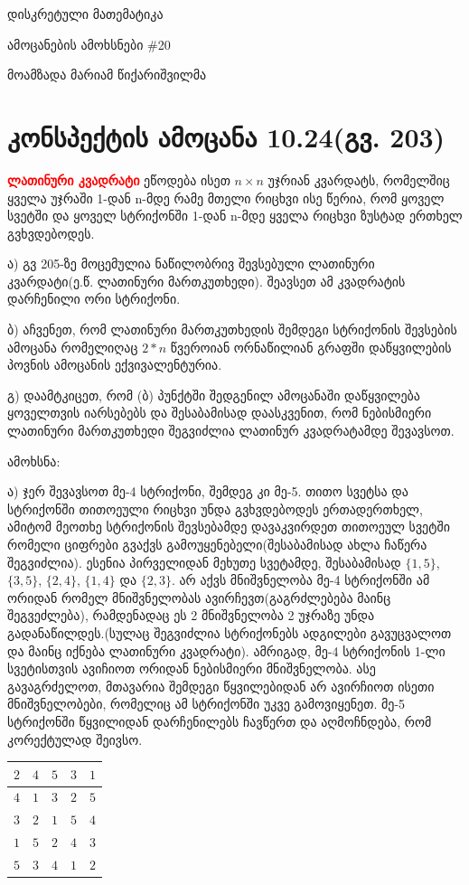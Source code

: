 \documentclass[a4paper, 11pt]{article}
\begin{document}
\begin{sloppypar}

\begin{center}
\Large
{
დისკრეტული მათემატიკა
}

\large
ამოცანების ამოხსნები \#20

\normalsize
\hfill მოამზადა მარიამ წიქარიშვილმა
\end{center}

\section{კონსპექტის ამოცანა 10.24(გვ. 203)}

\textbf{\textcolor{red}{ლათინური კვადრატი}} ეწოდება ისეთ $n\times n$ უჯრიან კვარდატს, რომელშიც ყველა უჯრაში 1-დან n-მდე რამე მთელი რიცხვი ისე წერია, რომ ყოველ სვეტში და ყოველ სტრიქონში 1-დან n-მდე ყველა რიცხვი ზუსტად ერთხელ გვხვდებოდეს.

ა) გვ 205-ზე მოცემულია ნაწილობრივ შევსებული ლათინური კვარდატი(ე.წ. ლათინური მართკუთხედი). შეავსეთ ამ კვადრატის დარჩენილი ორი სტრიქონი.

ბ) აჩვენეთ, რომ ლათინური მართკუთხედის შემდეგი სტრიქონის შევსების ამოცანა რომელიღაც $2*n$ წვეროიან ორნაწილიან გრაფში დაწყვილების პოვნის ამოცანის ექვივალენტურია.

გ) დაამტკიცეთ, რომ (ბ) პუნქტში შედგენილ ამოცანაში დაწყვილება ყოველთვის იარსებებს და შესაბამისად დაასკვენით, რომ ნებისმიერი ლათინური მართკუთხედი შეგვიძლია ლათინურ კვადრატამდე შევავსოთ.

{
ამოხსნა:
}

ა) ჯერ შევავსოთ მე-4 სტრიქონი, შემდეგ კი მე-5. თითო სვეტსა და სტრიქონში თითოეული რიცხვი უნდა გვხვდებოდეს ერთადერთხელ, ამიტომ მეოთხე სტრიქონის შევსებამდე დავაკვირდეთ თითოეულ სვეტში რომელი ციფრები გვაქვს გამოუყენებელი(შესაბამისად ახლა ჩაწერა შეგვიძლია). ესენია პირველიდან მეხუთე სვეტამდე, შესაბამისად $\{1 , 5\}$, $\{3,5\}$, $\{2,4\}$, $\{1,4\}$ და $\{2,3\}$. არ აქვს მნიშვნელობა მე-4 სტრიქონში ამ ორიდან რომელ მნიშვნელობას ავირჩევთ(გაგრძლებება მაინც შეგვეძლება), რამდენადაც ეს 2 მნიშვნელობა 2 უჯრაზე უნდა გადანაწილდეს.(სულაც შეგვიძლია სტრიქონებს ადგილები გავუცვალოთ და მაინც იქნება ლათინური კვადრატი). ამრიგად, მე-4 სტრიქონის 1-ლი სვეტისთვის ავიჩიოთ ორიდან ნებისმიერი მნიშვნელობა. ასე გავაგრძელოთ, მთავარია შემდეგი წყვილებიდან არ ავირჩიოთ ისეთი მნიშვნელობები, რომელიც ამ სტრიქონში უკვე გამოვიყენეთ. მე-5 სტრიქონში წყვილიდან დარჩენილებს ჩავწერთ და აღმოჩნდება, რომ კორექტულად შეივსო.
\begin{center}
\begin{tabular}{|c|c|c|c|c|} 
    \hline
    $2$ & $4$ & $5$ & $3$ & $1$ \\
    \hline 
    $4$ & $1$ & $3$ & $2$ & $5$ \\
    \hline
    $3$ & $2$ & $1$ & $5$ & $4$ \\
    \hline
    $1$ & $5$ & $2$ & $4$ & $3$ \\
    \hline 
    $5$ & $3$ & $4$ & $1$ & $2$ \\
    \hline 
\end{tabular}
\end{center}


\end{sloppypar}
\end{document}
